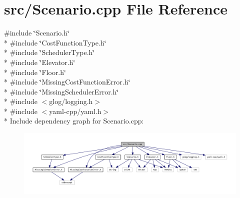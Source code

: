 \section{src/\+Scenario.cpp File Reference}
\label{_scenario_8cpp}
{\ttfamily \#include \char`\"{}Scenario.\+h\char`\"{}}\\*
{\ttfamily \#include \char`\"{}Cost\+Function\+Type.\+h\char`\"{}}\\*
{\ttfamily \#include \char`\"{}Scheduler\+Type.\+h\char`\"{}}\\*
{\ttfamily \#include \char`\"{}Elevator.\+h\char`\"{}}\\*
{\ttfamily \#include \char`\"{}Floor.\+h\char`\"{}}\\*
{\ttfamily \#include \char`\"{}Missing\+Cost\+Function\+Error.\+h\char`\"{}}\\*
{\ttfamily \#include \char`\"{}Missing\+Scheduler\+Error.\+h\char`\"{}}\\*
{\ttfamily \#include $<$glog/logging.\+h$>$}\\*
{\ttfamily \#include $<$yaml-\/cpp/yaml.\+h$>$}\\*
Include dependency graph for Scenario.\+cpp\+:\nopagebreak
\begin{figure}[H]
\begin{center}
\leavevmode
\includegraphics[width=350pt]{_scenario_8cpp__incl}
\end{center}
\end{figure}
